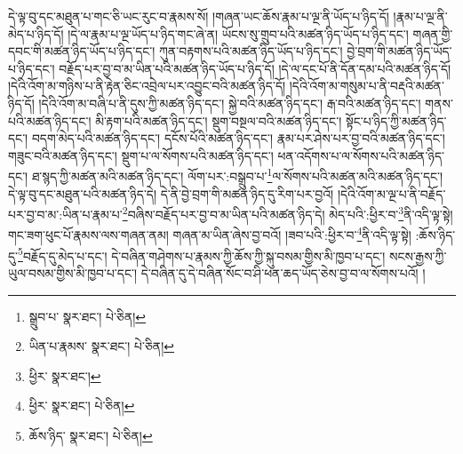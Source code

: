 དེ་ལྟ་བུ་དང་མཐུན་པ་གང་ཅི་ཡང་རུང་བ་རྣམས་སོ། །གཞན་ཡང་ཆོས་རྣམ་པ་ལྔ་ནི་ཡོད་པ་ཉིད་དོ། །རྣམ་པ་ལྔ་ནི་མེད་པ་ཉིད་དོ། །དེ་ལ་རྣམ་པ་ལྔ་ཡོད་པ་ཉིད་གང་ཞེ་ན། ཡོངས་སུ་གྲུབ་པའི་མཚན་ཉིད་ཡོད་པ་ཉིད་དང་། གཞན་གྱི་དབང་གི་མཚན་ཉིད་ཡོད་པ་ཉིད་དང་། ཀུན་བརྟགས་པའི་མཚན་ཉིད་ཡོད་པ་ཉིད་དང་། བྱེ་བྲག་གི་མཚན་ཉིད་ཡོད་པ་ཉིད་དང་། བརྗོད་པར་བྱ་བ་མ་ཡིན་པའི་མཚན་ཉིད་ཡོད་པ་ཉིད་དོ། །དེ་ལ་དང་པོ་ནི་དོན་དམ་པའི་མཚན་ཉིད་དོ། །དེའི་འོག་མ་གཉིས་པ་ནི་རྟེན་ཅིང་འབྲེལ་པར་འབྱུང་བའི་མཚན་ཉིད་དོ། །དེའི་འོག་མ་གསུམ་པ་ནི་བརྡའི་མཚན་ཉིད་དོ། །དེའི་འོག་མ་བཞི་པ་ནི་དུས་ཀྱི་མཚན་ཉིད་དང་། སྐྱེ་བའི་མཚན་ཉིད་དང་། རྒ་བའི་མཚན་ཉིད་དང་། གནས་པའི་མཚན་ཉིད་དང་། མི་རྟག་པའི་མཚན་ཉིད་དང་། སྡུག་བསྔལ་བའི་མཚན་ཉིད་དང་། སྟོང་པ་ཉིད་ཀྱི་མཚན་ཉིད་དང་། བདག་མེད་པའི་མཚན་ཉིད་དང་། དངོས་པོའི་མཚན་ཉིད་དང་། རྣམ་པར་ཤེས་པར་བྱ་བའི་མཚན་ཉིད་དང་། གཟུང་བའི་མཚན་ཉིད་དང་། སྡུག་པ་ལ་སོགས་པའི་མཚན་ཉིད་དང་། ཕན་འདོགས་པ་ལ་སོགས་པའི་མཚན་ཉིད་དང་། ཐ་སྙད་ཀྱི་མཚན་མའི་མཚན་ཉིད་དང་། ལོག་པར་:བསྒྲུབ་པ་\footnote{སྒྲུབ་པ་  སྣར་ཐང་།  པེ་ཅིན། }ལ་སོགས་པའི་མཚན་མའི་མཚན་ཉིད་དང་། དེ་ལྟ་བུ་དང་མཐུན་པའི་མཚན་ཉིད་དེ། དེ་ནི་བྱེ་བྲག་གི་མཚན་ཉིད་དུ་རིག་པར་བྱའོ། །དེའི་འོག་མ་ལྔ་པ་ནི་བརྗོད་པར་བྱ་བ་མ་:ཡིན་པ་རྣམ་པ་\footnote{ཡིན་པ་རྣམས་  སྣར་ཐང་།  པེ་ཅིན། }བཞིས་བརྗོད་པར་བྱ་བ་མ་ཡིན་པའི་མཚན་ཉིད་དེ། མེད་པའི་:ཕྱིར་བ་\footnote{ཕྱིར་  སྣར་ཐང་། }ནི་འདི་ལྟ་སྟེ། གང་ཟག་ཕུང་པོ་རྣམས་ལས་གཞན་ནམ། གཞན་མ་ཡིན་ཞེས་བྱ་བའོ། །ཟབ་པའི་:ཕྱིར་བ་\footnote{ཕྱིར་  སྣར་ཐང་།  པེ་ཅིན། }ནི་འདི་ལྟ་སྟེ། :ཆོས་ཉིད་དུ་\footnote{ཆོས་ཉིད་  སྣར་ཐང་།  པེ་ཅིན། }བརྗོད་དུ་མེད་པ་དང་། དེ་བཞིན་གཤེགས་པ་རྣམས་ཀྱི་ཆོས་ཀྱི་སྐུ་བསམ་གྱིས་མི་ཁྱབ་པ་དང་། སངས་རྒྱས་ཀྱི་ཡུལ་བསམ་གྱིས་མི་ཁྱབ་པ་དང་། དེ་བཞིན་དུ་དེ་བཞིན་སོང་བ་ཤི་ཕན་ཆད་ཡོད་ཅེས་བྱ་བ་ལ་སོགས་པའོ། །
